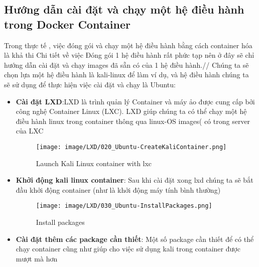 \documentclass[a4paper,12pt]{article}
\begin{document}
\subsection{Hướng dẫn cài đặt và chạy một hệ điều hành trong Docker Container}
Trong thực tế , việc đóng gói và chạy một hệ điều hành bằng cách container hóa là khả thi 
Chi tiết về việc Đóng gói 1 hệ điều hành rất phức tạp nên ở đây sẽ chỉ hướng dẫn cài đặt và chạy images đã sẵn có của 1 hệ điều hành.//
Chúng ta sẽ chọn lựa một hệ điều hành là kali-linux để làm ví dụ, và hệ điều hành chúng ta sẽ sử dụng để thực hiện việc cài đặt và chạy là Ubuntu: 
\begin{itemize}


\begin{figure}[htbp]
    \centering
    \texttt{[image: image/LXD/010\_Ubuntu-SnapInstallLXD.png]}
    \caption{Install lxd via snap and perform initial setup}
    \label{}
\end{figure}



    \item \textbf{Cài đặt LXD}:LXD là trình quản lý Container và máy ảo được cung cấp bởi công nghệ Container Linux (LXC). LXD giúp chúng ta có thể chạy một hệ điều hành linux trong container thông qua linux-OS images( có trong server của LXC\\
    





    \begin{figure}[htbp]
    \centering
    \texttt{[image: image/LXD/020\_Ubuntu-CreateKaliContainer.png]}
    \caption{Launch Kali Linux container with lxc}
    \label{}
\end{figure}



    
    \item \textbf{Khởi động kali linux container}: Sau khi cài đặt xong lxd chúng ta sẽ bắt đầu khởi động container (như là khởi động máy tính bình thường)
    


\begin{figure}[htbp]
    \centering
    \texttt{[image: image/LXD/030\_Ubuntu-InstallPackages.png]}
    \caption{Install packages}
    \label{}
\end{figure}




\item \textbf{Cài đặt thêm các package cần thiết}: Một số  package cần thiết để có thể  chạy container cũng như giúp cho việc sử dụng kali trong container được mượt mà hơn







\end{itemize}
\end{document}
